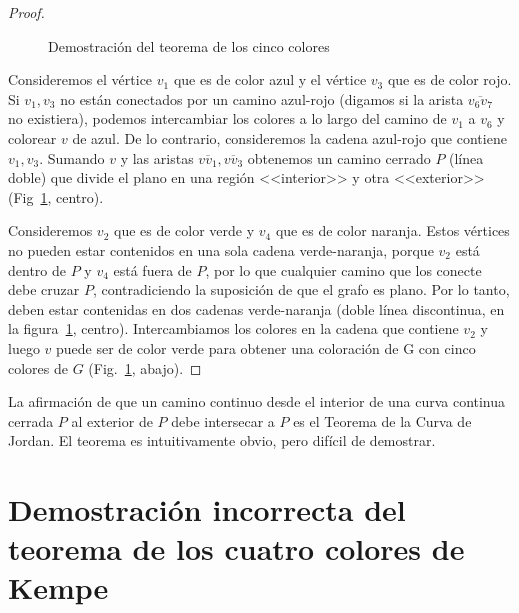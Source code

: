 \begin{proof}
\begin{figure}
\begin{center}
\end{center}
\caption{Demostración del teorema de los cinco colores}\label{f.five-color-proof}
\end{figure}

Consideremos el vértice $v_1$ que es de color azul y el vértice $v_3$ que es de color rojo. Si $v_1,v_3$ no están conectados por un camino azul-rojo (digamos si la arista $\overline{v_6v_7}$ no existiera), podemos intercambiar los colores a lo largo del camino de $v_1$ a $v_6$ y colorear $v$ de azul. De lo contrario, consideremos la cadena azul-rojo que contiene $v_1,v_3$. Sumando $v$ y las aristas $\overline{vv_1},\overline{vv_3}$ obtenemos un camino cerrado $P$ (línea doble) que divide el plano en una región <<interior>> y otra <<exterior>> (Fig~\ref{f.five-color-proof}, centro).

Consideremos $v_2$ que es de color verde y $v_4$ que es de color naranja. Estos vértices no pueden estar contenidos en una sola cadena verde-naranja, porque $v_2$ está dentro de $P$ y $v_4$ está fuera de $P$, por lo que cualquier camino que los conecte debe cruzar $P$, contradiciendo la suposición de que el grafo es plano. Por lo tanto, deben estar contenidas en dos cadenas verde-naranja (doble línea discontinua, en la figura~\ref{f.five-color-proof}, centro).
Intercambiamos los colores en la cadena que contiene $v_2$ y luego $v$ puede ser de color verde para obtener una coloración de G con cinco colores de $G$ (Fig.~\ref{f.five-color-proof}, abajo).
\end{proof}

\begin{advanced}
La afirmación de que un camino continuo desde el interior de una curva continua cerrada $P$ al exterior de $P$ debe intersecar a $P$ es el Teorema de la Curva de Jordan. El teorema es intuitivamente obvio, pero difícil de demostrar.
\end{advanced}


\section{Demostración incorrecta del teorema de los cuatro colores de Kempe}\label{s.kempe}

